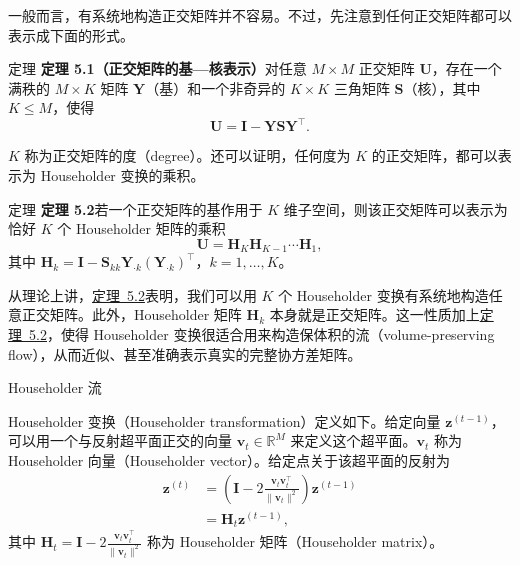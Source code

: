 一般而言，有系统地构造正交矩阵并不容易。不过，先注意到任何正交矩阵都可以表示成下面的形式。
\begin{booknote}{定理}
\textbf{\hypertarget{thm:05-01}{定理 5.1}（正交矩阵的基—核表示）}\quad 对任意 $M\times M$ 正交矩阵 $\mathbf{U}$，存在一个满秩的 $M\times K$ 矩阵 $\mathbf{Y}$（基）和一个非奇异的 $K\times K$ 三角矩阵 $\mathbf{S}$（核），其中 $K\leq M$，使得
\begin{equation}
\mathbf{U}=\mathbf{I}-\mathbf{Y}\mathbf{S}\mathbf{Y}^\top.
\tag{5.56}\label{eq:05-56}
\end{equation}
\end{booknote}

$K$ 称为正交矩阵的度（degree）。还可以证明，任何度为 $K$ 的正交矩阵，都可以表示为 Householder 变换的乘积。
\begin{booknote}{定理}
\textbf{\hypertarget{thm:05-02}{定理 5.2}}\quad 若一个正交矩阵的基作用于 $K$ 维子空间，则该正交矩阵可以表示为恰好 $K$ 个 Householder 矩阵的乘积
\begin{equation}
\mathbf{U}=\mathbf{H}_K\mathbf{H}_{K-1}\cdots\mathbf{H}_1,
\tag{5.57}\label{eq:05-57}
\end{equation}
其中 $\mathbf{H}_k=\mathbf{I}-\mathbf{S}_{kk}\mathbf{Y}_{\cdot k}(\mathbf{Y}_{\cdot k})^\top$，$k=1,\ldots,K$。
\end{booknote}

从理论上讲，\hyperlink{thm:05-02}{定理~5.2}表明，我们可以用 $K$ 个 Householder 变换有系统地构造任意正交矩阵。此外，Householder 矩阵 $\mathbf{H}_k$ 本身就是正交矩阵。这一性质加上\hyperlink{thm:05-02}{定理~5.2}，使得 Householder 变换很适合用来构造保体积的流（volume-preserving flow），从而近似、甚至准确表示真实的完整协方差矩阵。

\medskip\noindent Householder 流\par\smallskip
Householder 变换（Householder transformation）定义如下。给定向量 $\mathbf{z}^{(t-1)}$，可以用一个与反射超平面正交的向量 $\mathbf{v}_t\in\mathbb{R}^M$ 来定义这个超平面。$\mathbf{v}_t$ 称为 Householder 向量（Householder vector）。给定点关于该超平面的反射为
\begin{align}
\mathbf{z}^{(t)}
 &=\left(\mathbf{I}-2\frac{\mathbf{v}_t\mathbf{v}_t^\top}{\|\mathbf{v}_t\|^2}\right)\mathbf{z}^{(t-1)}
 \tag{5.58}\label{eq:05-58}\\
 &=\mathbf{H}_t\mathbf{z}^{(t-1)}, \tag{5.59}\label{eq:05-59}
\end{align}
其中 $\mathbf{H}_t=\mathbf{I}-2\frac{\mathbf{v}_t\mathbf{v}_t^\top}{\|\mathbf{v}_t\|^2}$ 称为 Householder 矩阵（Householder matrix）。

